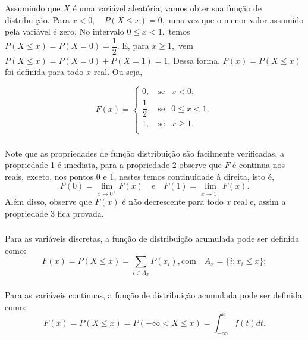 \documentclass[14pt,aspectratio=1610]{beamer}
\begin{document}
\begin{frame}{}
\frametitle{}
\begin{block}{}
\justifying
Assumindo que $X$ é uma variável aleatória, vamos obter sua função de distribuição.
Para $x<0, \quad P(X\leq x)=0,$ uma vez que o menor valor assumido pela variável é zero. No intervalo $0\leq x <1,$ temos $P(X\leq x)=P(X=0)=\dfrac{1}{2}.$ E, para 
$x\geq 1,$ vem $P(X\leq x)=P(X=0)+P(X=1)=1.$ Dessa forma, $F(x)=P(X\leq x)$ foi definida para todo $x$ real. Ou seja,

$$
F(x)=\left\{
\begin{array}{ccccc}
0,           & \textrm{se} & x<0     ;\\
\dfrac{1}{2},& \textrm{se} & 0\leq x<1;\\
1,           & \textrm{se} & x\geq 1 .\\
\end{array}
\right.
$$
\end{block}
\end{frame}

\begin{frame}{}
\frametitle{}
\begin{block}{}
\justifying
Note que as propriedades de função distribuição são facilmente verificadas, a propriedade 1 é imediata, para a propriedade 2 observe que $F$ é continua nos reais, 
exceto, nos pontos 0 e 1, nestes temos continuidade à direita, isto é, 
$${\displaystyle F(0)= \lim_{x \to 0^{+}}F(x)\quad \textrm{e}\quad 
                 F(1)= \lim_{x \to 1^{+}}F(x)}.$$ 
Além disso, observe que $F(x)$ é não decrescente para todo $x$ real e, assim a propriedade 3 fica provada.
\end{block}
\end{frame}

\begin{frame}{}
\frametitle{}
\begin{block}{}
\justifying
Para as variáveis discretas, a função de distribuição acumulada pode ser definida como: $$\displaystyle F(x)=P(X\leq x)=\sum_{i\in A_{x}}P(x_{i}),\textrm{com}\quad
A_{x}=\{i;x_{i}\leq x\};$$
\end{block}
\end{frame}

\begin{frame}{}
\frametitle{}
\begin{block}{}
\justifying
Para as variáveis contínuas, a função de distribuição acumulada pode ser definida como: $$\displaystyle F(x)=P(X\leq x)=P(-\infty <X\leq x)=\int_{-\infty}^{x}f(t)dt.$$
\end{block}
\end{frame}
\end{document}
